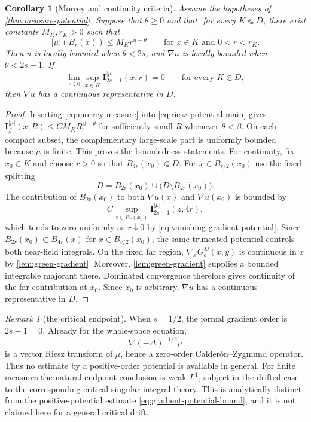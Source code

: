 \documentclass[reqno]{amsart}
\numberwithin{equation}{section}
\theoremstyle{plain}
\newtheorem{corollary}[theorem]{Corollary}
\theoremstyle{definition}
\theoremstyle{remark}
\newtheorem{remark}[theorem]{Remark}
\newcommand{\I}{\mathbf I}
\newcommand{\rev}[1]{#1}
\begin{document}
\begin{corollary}[Morrey and continuity criteria]
\label{cor:measure-morrey}
Assume the hypotheses of \cref{thm:measure-potential}.  Suppose that
$\theta\ge0$ and that, for every $K\Subset D$, there exist constants
$M_K,r_K>0$ such that
\begin{equation}\label{eq:morrey-measure}
 |\mu|(B_r(x))\le M_K r^{n-\theta}
 \qquad\text{for }x\in K\text{ and }0<r<r_K.
\end{equation}
\rev{Then} $u$ is locally bounded when $\theta<2s$, and $\nabla u$ is locally
bounded when $\theta<2s-1$.  If
\begin{equation}\label{eq:vanishing-gradient-potential}
 \lim_{r\downarrow0}\sup_{x\in K}
 \I_{2s-1}^{|\mu|}(x,r)=0
 \qquad\text{for every }K\Subset D,
\end{equation}
then $\nabla u$ has a continuous representative in $D$.
\end{corollary}

\begin{proof}
Inserting \eqref{eq:morrey-measure} into
\eqref{eq:riesz-potential-main} gives
$\I_\beta^{|\mu|}(x,R)\le CM_K R^{\beta-\theta}$ for sufficiently small
$R$ whenever $\theta<\beta$.  On each compact subset, the complementary
large-scale part is uniformly bounded because $\mu$ is finite.  This proves
the boundedness statements.  For continuity,
fix $x_0\in K$ and choose $r>0$ so that
$B_{4r}(x_0)\Subset D$.  For $x\in B_{r/2}(x_0)$ use the fixed splitting
\[
 D=B_{2r}(x_0)\cup\bigl(D\setminus B_{2r}(x_0)\bigr).
\]
The contribution of $B_{2r}(x_0)$ to both $\nabla u(x)$ and
$\nabla u(x_0)$ is bounded by
\[
 C\sup_{z\in B_r(x_0)}\I_{2s-1}^{|\mu|}(z,4r),
\]
which tends to zero uniformly as $r\downarrow0$ by
\eqref{eq:vanishing-gradient-potential}.  \rev{Since
$B_{2r}(x_0)\subset B_{4r}(x)$ for $x\in B_{r/2}(x_0)$, the same
truncated potential controls both near-field integrals.}  On the fixed far region,
$\nabla_xG_b^D(x,y)$ is continuous in $x$ by
\cref{lem:green-gradient}.  Moreover,
\cref{lem:green-gradient} supplies a bounded integrable majorant there.
Dominated convergence therefore gives continuity of the far contribution
at $x_0$.  Since $x_0$ is arbitrary, $\nabla u$ has a continuous
representative in $D$.
\end{proof}

\begin{remark}[the critical endpoint]
When $s=1/2$, the formal gradient order is $2s-1=0$.  Already for the
whole-space equation,
\[
 \nabla(-\Delta)^{-1/2}\mu
\]
is a vector Riesz transform of $\mu$, hence a zero-order Calder\'on--Zygmund
operator.  Thus no estimate by a positive-order potential is available in
general.  For finite measures the natural endpoint conclusion is weak
$L^1$, subject in the drifted case to the corresponding critical singular
integral theory.  This is analytically distinct from the positive-potential
estimate \eqref{eq:gradient-potential-bound}, and it is not claimed here for
a general critical drift.
\end{remark}
\end{document}
